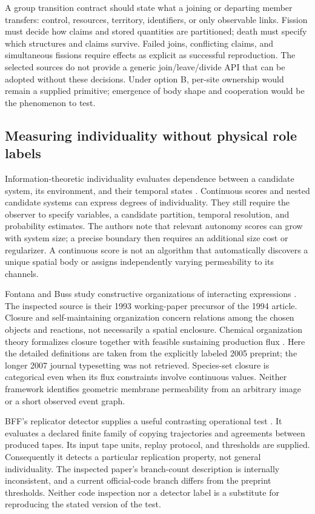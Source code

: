 A group transition contract should state what a joining or departing member
transfers: control, resources, territory, identifiers, or only observable
links. Fission must decide how claims and stored quantities are partitioned;
death must specify which structures and claims survive. Failed joins,
conflicting claims, and simultaneous fissions require effects as explicit as
successful reproduction. The selected sources do not provide a generic
join/leave/divide API that can be adopted without these decisions. Under
option B, per-site ownership would remain a supplied primitive; emergence of
body shape and cooperation would be the phenomenon to test.

\subsection{Measuring individuality without physical role labels}
Information-theoretic individuality evaluates dependence between a candidate
system, its environment, and their temporal states \citep{Krakauer2020}.
Continuous scores and nested candidate systems can express degrees of
individuality. They still require the observer to specify variables, a
candidate partition, temporal resolution, and probability estimates. The
authors note that relevant autonomy scores can grow with system size; a
precise boundary then requires an additional size cost or regularizer. A
continuous score is not an algorithm that automatically discovers a unique
spatial body or assigns independently varying permeability to its channels.

Fontana and Buss study constructive organizations of interacting expressions
\citep{FontanaBuss1993}. The inspected source is their 1993 working-paper
precursor of the 1994 article. Closure and self-maintaining organization concern
relations among the chosen objects and reactions, not necessarily a spatial
enclosure. Chemical organization theory formalizes closure together with
feasible sustaining production flux \citep{Dittrich2005}. Here the detailed
definitions are taken from the explicitly labeled 2005 preprint; the longer
2007 journal typesetting was not retrieved. Species-set closure is categorical
even when its flux constraints involve continuous values. Neither framework
identifies geometric membrane permeability from an arbitrary image or a
short observed event graph.

BFF's replicator detector supplies a useful contrasting operational test
\citep{Knierim2026}. It evaluates a declared finite family of copying
trajectories and agreements between produced tapes. Its input tape units,
replay protocol, and thresholds are supplied. Consequently it detects a
particular replication property, not general individuality. The inspected
paper's branch-count description is internally inconsistent, and a current
official-code branch differs from the preprint thresholds. Neither code
inspection nor a detector label is a substitute for reproducing the stated
version of the test.

